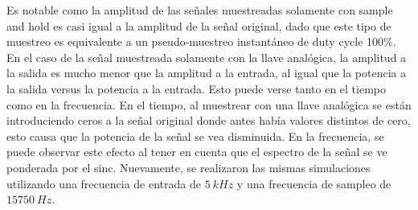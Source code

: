 Es notable como la amplitud de las señales muestreadas solamente con sample and hold es casi igual a la amplitud de la señal original, dado que este tipo de muestreo es equivalente a un pseudo-muestreo instantáneo de duty cycle 100\%. En el caso de la señal muestreada solamente con la llave analógica, la amplitud a la salida es mucho menor que la amplitud a la entrada, al igual que la potencia a la salida versus la potencia a la entrada. Esto puede verse tanto en el tiempo como en la frecuencia. En el tiempo, al muestrear con una llave analógica se están introduciendo ceros a la señal original donde antes había valores distintos de cero, esto causa que la potencia de la señal se vea disminuida. En la frecuencia, se puede observar este efecto al tener en cuenta que el espectro de la señal se ve ponderada por el sinc.
Nuevamente, se realizaron las mismas simulaciones utilizando una frecuencia de entrada de $5 \ kHz$ y una frecuencia de sampleo de $15750 \ Hz$.

